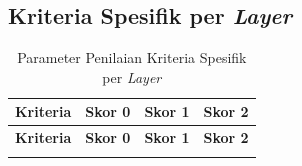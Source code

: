 \subsection{Kriteria Spesifik per \textit{Layer}}
\label{sec:appx-rubrik-spesifik}

{
\footnotesize
\setlength{\tabcolsep}{3pt}
\renewcommand{\arraystretch}{1.2}
\setlength{\LTpost}{0pt}
\begin{longtable}{|>{\raggedright\arraybackslash}m{2.6cm}|>{\raggedright\arraybackslash}m{3.4cm}|>{\raggedright\arraybackslash}m{3.5cm}|>{\raggedright\arraybackslash}m{3.5cm}|}
\caption{Parameter Penilaian Kriteria Spesifik per \textit{Layer}}
\label{tab:rubrik_spesifik} \\
\hline
\textbf{Kriteria} & \textbf{Skor 0} & \textbf{Skor 1} & \textbf{Skor 2} \\
\hline
\endfirsthead
\hline
\textbf{Kriteria} & \textbf{Skor 0} & \textbf{Skor 1} & \textbf{Skor 2} \\
\hline
\endhead
\endfoot
\hline
\endlastfoot


\end{longtable}}
